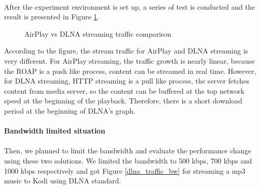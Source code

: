 \\
After the experiment environment is set up, a series of test is conducted and the result is presented in Figure \ref{airplay_vs_dlna_traffic}.
\begin{figure}
\hfill
{}
\hfill
{}
\hfill
\caption{AirPlay vs DLNA streaming traffic
comparison \label{airplay_vs_dlna_traffic}}
\end{figure}
According to the figure, the stream traffic for
AirPlay and DLNA streaming is very different. For AirPlay streaming, the traffic
growth is nearly linear, because the ROAP is a push like process, content can be
streamed in real time. However, for DLNA streaming, HTTP streaming is a pull
like process, the server fetches content from media server, so the content can
be buffered at the top network speed at the beginning of the playback.
Therefore, there is a short download period at the beginning of DLNA's
graph. \\ 
\\
\textbf{Bandwidth limited situation}\\
\\
Then, we planned to limit the bandwidth and evaluate the performance change using these two solutions. We limited the bandwidth to 500 kbps, 700 kbps and 1000 kbps respectively and got Figure \ref{dlna_traffic_bw} for streaming a mp3 music to Kodi using DLNA standard.

